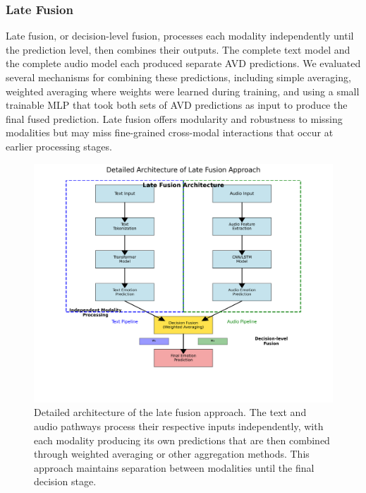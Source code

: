 \documentclass[12pt]{article}
\begin{document}
\subsubsection{Late Fusion}
Late fusion, or decision-level fusion, processes each modality independently until the prediction level, then combines their outputs. The complete text model and the complete audio model each produced separate AVD predictions. We evaluated several mechanisms for combining these predictions, including simple averaging, weighted averaging where weights were learned during training, and using a small trainable MLP that took both sets of AVD predictions as input to produce the final fused prediction. Late fusion offers modularity and robustness to missing modalities but may miss fine-grained cross-modal interactions that occur at earlier processing stages.

\begin{figure}[h]
    \centering
    \includegraphics[width=0.9\linewidth]{Figures/late_fusion_detailed_proper.png}
    \caption{Detailed architecture of the late fusion approach. The text and audio pathways process their respective inputs independently, with each modality producing its own predictions that are then combined through weighted averaging or other aggregation methods. This approach maintains separation between modalities until the final decision stage.}
    \label{fig:late_fusion}
\end{figure}
\end{document}
